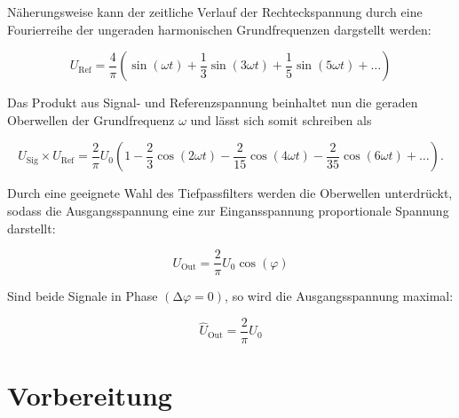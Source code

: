 \noindent Näherungsweise kann der zeitliche Verlauf der Rechteckspannung durch eine Fourierreihe der ungeraden harmonischen
Grundfrequenzen dargstellt werden:

\begin{equation*}
    U_\text{Ref} = \frac{4}{\pi}\left(\sin(\omega t) + \frac{1}{3}\sin(3\omega t) + \frac{1}{5}\sin(5\omega t) + \dotsc\right)
\end{equation*}

\noindent Das Produkt aus Signal- und Referenzspannung beinhaltet nun die geraden Oberwellen der Grundfrequenz $\omega$ und lässt
sich somit schreiben als

\begin{equation*}
    U_\text{Sig} \times U_\text{Ref} = \frac{2}{\pi}U_0\left(1 - \frac{2}{3}\cos(2\omega t) - \frac{2}{15}\cos(4\omega t) - \frac{2}{35}\cos(6\omega t) + \dotsc\right).
\end{equation*}

\noindent Durch eine geeignete Wahl des Tiefpassfilters werden die Oberwellen unterdrückt, sodass die Ausgangsspannung eine zur Eingansspannung
proportionale Spannung darstellt:

\begin{equation}
    U_\text{Out} = \frac{2}{\pi}U_0\cos(\varphi)
    \label{eqn:U_out}
\end{equation}

\noindent Sind beide Signale in Phase $\left(\increment \varphi = 0\right)$, so wird die Ausgangsspannung maximal:

\begin{equation*}
    \hat{U}_\text{Out} = \frac{2}{\pi}U_0
\end{equation*}

\section{Vorbereitung}

